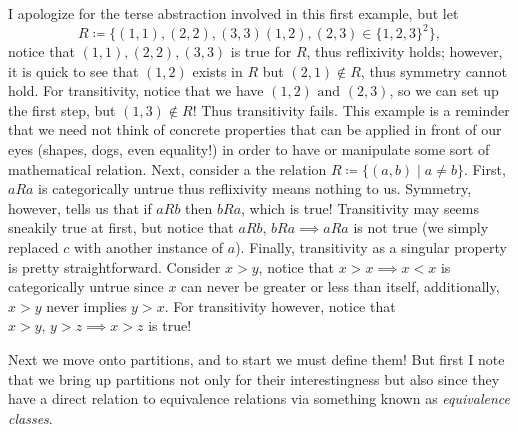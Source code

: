 \documentclass{report}
\begin{document}

\sol I apologize for the terse abstraction involved in this first example, but let \[ R\coloneqq \{(1,1),(2,2),(3,3)(1,2),(2,3)\in \{1,2,3\}^2  \}   ,\] notice that \( (1,1),(2,2),(3,3) \) is true for \( R \), thus reflixivity holds; however, it is quick to see that \( (1,2) \) exists in \( R \) but \( (2,1)\not\in R \), thus symmetry cannot hold. For transitivity, notice that we have \( (1,2) \text{ and }  (2,3)\), so we can set up the first step, but \( (1,3)\not\in  R \)! Thus transitivity fails. This example is a reminder that we need not think of concrete properties that can be applied in front of our eyes (shapes, dogs, even equality!) in order to have or manipulate some sort of mathematical relation. Next, consider a the relation \( R\coloneqq \{(a,b)\mid a \neq  b\}   \). First, \( aRa \) is categorically untrue thus reflixivity means nothing to us. Symmetry, however, tells us that if \( aRb \) then \( bRa \), which is true! Transitivity may seems sneakily true at first, but notice that \( aRb, \, bRa \implies aRa \) is not true (we simply replaced \( c \) with another instance of \( a \)). Finally, transitivity as a singular property is pretty straightforward. Consider \( x>y \), notice that \( x>x \implies x<x \) is categorically untrue since \( x \) can never be greater or less than itself, additionally, \( x>y \) never implies \( y>x \). For transitivity however, notice that \(x>y, \, y>z \implies x>z \) is true!


Next we move onto partitions, and to start we must define them! But first I note that we bring up partitions not only for their interestingness but also since they have a direct relation to equivalence relations via something known as \textit{equivalence classes}. 
\end{document}
